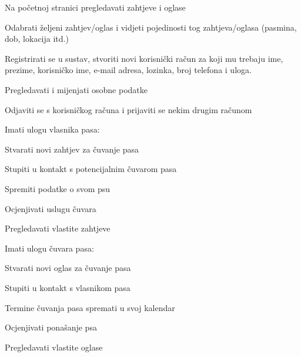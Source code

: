 			
			\begin{packed_enum}
				\item  {}
				
				\begin{packed_enum}
					
					\item Na početnoj stranici pregledavati zahtjeve i oglase
					\item Odabrati željeni zahtjev/oglas i vidjeti pojedinosti tog zahtjeva/oglasa (pasmina, dob, lokacija itd.)
					\item Registrirati se u sustav, stvoriti novi korisnički račun za koji mu trebaju ime, prezime, korisničko ime, e-mail adresa, lozinka, broj telefona i uloga.
				\end{packed_enum}
				
				\item  {}
				
				\begin{packed_enum}
					
					\item Pregledavati i mijenjati osobne podatke
					\item Odjaviti se s korisničkog računa i prijaviti se nekim drugim računom
					\item Imati ulogu vlasnika pasa:
					\begin{packed_enum}
						\item Stvarati novi zahtjev za čuvanje pasa
						\item Stupiti u kontakt s potencijalnim čuvarom pasa
						\item Spremiti podatke o svom psu
						\item Ocjenjivati uslugu čuvara
						\item Pregledavati vlastite zahtjeve
					\end{packed_enum}
					\item Imati ulogu čuvara pasa:
					\begin{packed_enum}
						\item Stvarati novi oglas za čuvanje pasa
						\item Stupiti u kontakt s vlasnikom pasa
						\item Termine čuvanja pasa spremati u svoj kalendar
						\item Ocjenjivati ponašanje psa
						\item Pregledavati vlastite oglase
					\end{packed_enum}
				\end{packed_enum}
			

\end{packed_enum}
